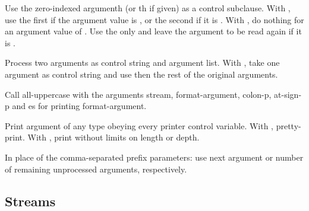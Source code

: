 \begin{LIST}{1cm}
\begin{LIST}{.5cm}
    {%
      Use the zero-indexed argumenth (or
      th if given)  as a  control subclause.
      With \kwd{:}, use the first  if the argument value is
      \NIL, or the second  if it is \T. With , do nothing
      for an argument value of \NIL. Use the only  and leave
      the argument to be read again if it is \T.
    }

    {%
      Process two arguments as control string and argument list. With
      , take one argument as control string and use then the
      rest of the original arguments.
    }

    {%
      Call all-uppercase  with the
      arguments stream, format-ar\-gu\-ment, colon-p, at-sign-p and
      es for printing format-argument.
    }

    {%
      Print argument of any type obeying every printer control
      variable. With \kwd{:}, pretty-print. With , print
      without limits on length or depth.
    }

    {\index{\#}
      In place of the comma-separated prefix parameters: use next
      argument or number of remaining unprocessed arguments, respectively.
    }

  \end{LIST}

\end{LIST}


\subsection{Streams} 

